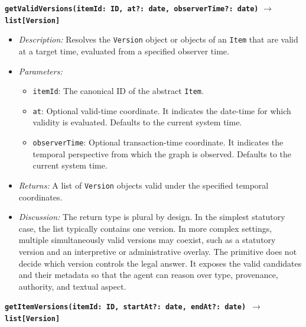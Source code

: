 \documentclass[11pt]{article}
\begin{document}
\vspace{0.3cm}
\noindent\textbf{\texttt{getValidVersions(itemId: ID, at?: date, observerTime?: date)}} \newline
\textbf{\texttt{$\rightarrow$ list[Version]}}

\begin{itemize}
    \item \textit{Description:} Resolves the \texttt{Version} object or objects of an \texttt{Item} that are valid at a target time, evaluated from a specified observer time.
    \item \textit{Parameters:}
    \begin{itemize}
        \item \texttt{itemId}: The canonical ID of the abstract \texttt{Item}.
        \item \texttt{at}: Optional valid-time coordinate. It indicates the date-time for which validity is evaluated. Defaults to the current system time.
        \item \texttt{observerTime}: Optional transaction-time coordinate. It indicates the temporal perspective from which the graph is observed. Defaults to the current system time.
    \end{itemize}
    \item \textit{Returns:} A list of \texttt{Version} objects valid under the specified temporal coordinates.
    \item \textit{Discussion:} The return type is plural by design. In the simplest statutory case, the list typically contains one version. In more complex settings, multiple simultaneously valid versions may coexist, such as a statutory version and an interpretive or administrative overlay. The primitive does not decide which version controls the legal answer. It exposes the valid candidates and their metadata so that the agent can reason over type, provenance, authority, and textual aspect.
\end{itemize}

\vspace{0.3cm}
\noindent\textbf{\texttt{getItemVersions(itemId: ID, startAt?: date, endAt?: date)
\newline
$\rightarrow$ list[Version]}}
\end{document}
